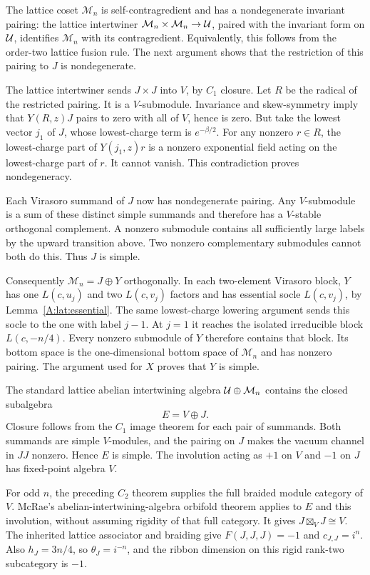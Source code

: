 \documentclass[11pt]{article}
\numberwithin{equation}{section}
\begin{document}
The lattice coset $\mathcal M_n$ is self-contragredient and has a nondegenerate invariant pairing: the lattice intertwiner $\mathcal M_n\times \mathcal M_n\to\mathcal U$, paired with the invariant form on $\mathcal U$, identifies $\mathcal M_n$ with its contragredient. Equivalently, this follows from the order-two lattice fusion rule. The next argument shows that the restriction of this pairing to $J$ is nondegenerate.

The lattice intertwiner sends $J\times J$ into $V$, by $C_1$ closure. Let $R$ be the radical of the restricted pairing. It is a $V$-submodule. Invariance and skew-symmetry imply that $Y(R,z)J$ pairs to zero with all of $V$, hence is zero. But take the lowest vector $j_1$ of $J$, whose lowest-charge term is $e^{-\beta/2}$. For any nonzero $r\in R$, the lowest-charge part of $Y(j_1,z)r$ is a nonzero exponential field acting on the lowest-charge part of $r$. It cannot vanish. This contradiction proves nondegeneracy.

Each Virasoro summand of $J$ now has nondegenerate pairing. Any $V$-submodule is a sum of these distinct simple summands and therefore has a $V$-stable orthogonal complement. A nonzero submodule contains all sufficiently large labels by the upward transition above. Two nonzero complementary submodules cannot both do this. Thus $J$ is simple.

Consequently $\mathcal M_n=J\oplus Y$ orthogonally. In each two-element Virasoro block, $Y$ has one $L(c,u_j)$ and two $L(c,v_j)$ factors and has essential socle $L(c,v_j)$, by Lemma~\ref{A:lat:essential}. The same lowest-charge lowering argument sends this socle to the one with label $j-1$. At $j=1$ it reaches the isolated irreducible block $L(c,-n/4)$. Every nonzero submodule of $Y$ therefore contains that block. Its bottom space is the one-dimensional bottom space of $\mathcal M_n$ and has nonzero pairing. The argument used for $X$ proves that $Y$ is simple.

The standard lattice abelian intertwining algebra $\mathcal U\oplus \mathcal M_n$ contains the closed subalgebra
\[
 E=V\oplus J.
\]
Closure follows from the $C_1$ image theorem for each pair of summands. Both summands are simple $V$-modules, and the pairing on $J$ makes the vacuum channel in $JJ$ nonzero. Hence $E$ is simple. The involution acting as $+1$ on $V$ and $-1$ on $J$ has fixed-point algebra $V$.

For odd $n$, the preceding $C_2$ theorem supplies the full braided module category of $V$. McRae's abelian-intertwining-algebra orbifold theorem \cite[Corollary 4.8]{A:Orb} applies to $E$ and this involution, without assuming rigidity of that full category. It gives $J\boxtimes_VJ\cong V$. The inherited lattice associator and braiding give $F(J,J,J)=-1$ and $c_{J,J}=i^n$. Also $h_J=3n/4$, so $\theta_J=i^{-n}$, and the ribbon dimension on this rigid rank-two subcategory is $-1$.
\end{document}
